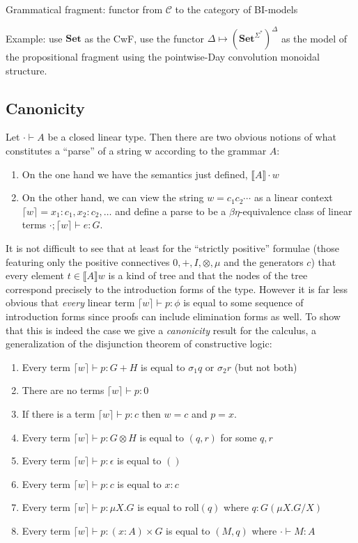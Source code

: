 \documentclass[sigconf,anonymous,review,screen]{acmart}
\newcommand{\Set}{\mathbf{Set}}
\begin{document}
Grammatical fragment: functor from $\mathcal C$ to the category of BI-models

Example: use $\Set$ as the CwF, use the functor $\Delta \mapsto
(\Set^{\Sigma^*})^\Delta$ as the model of the propositional fragment
using the pointwise-Day convolution monoidal structure.

\subsection{Canonicity}

Let $\cdot \vdash A$ be a closed linear type. Then there are
two obvious notions of what constitutes a ``parse'' of a string w
according to the grammar $A$:
\begin{enumerate}
\item On the one hand we have the semantics just defined, $\llbracket A \rrbracket \cdot w$
\item On the other hand, we can view the string $w = c_1c_2\cdots$ as
  a linear context $\lceil w \rceil = x_1:c_1,x_2:c_2,\ldots$ and
  define a parse to be a $\beta\eta$-equivalence class of linear terms $\cdot;
  \lceil w \rceil \vdash e : G$.
\end{enumerate}
It is not difficult to see that at least for the ``strictly positive''
formulae (those featuring only the positive connectives
$0,+,I,\otimes,\mu$ and the generators $c$) that every element $t \in
\llbracket A \rrbracket w$ is a kind of tree and that the nodes of the
tree correspond precisely to the introduction forms of the
type. However it is far less obvious that \emph{every} linear term
$\lceil w \rceil \vdash p : \phi$ is equal to some sequence of
introduction forms since proofs can include elimination forms as
well. To show that this is indeed the case we give a \emph{canonicity}
result for the calculus, a generalization of the disjunction theorem
of constructive logic:
\begin{enumerate}
\item Every term $\lceil w \rceil \vdash p : G + H$ is equal to $\sigma_1q$ or $\sigma_2 r$ (but not both)
\item There are no terms $\lceil w \rceil \vdash p : 0$
\item If there is a term $\lceil w \rceil \vdash p : c$ then $w = c$ and $p = x$.
\item Every term $\lceil w \rceil \vdash p : G \otimes H$ is equal to $(q,r)$ for some $q,r$
\item Every term $\lceil w \rceil \vdash p : \epsilon$ is equal to $()$
\item Every term $\lceil w \rceil \vdash p : c$ is equal to $x:c$
\item Every term $\lceil w \rceil \vdash p : \mu X. G$ is equal to $\textrm{roll}(q)$ where $q : G(\mu X.G/X)$
\item Every term $\lceil w \rceil \vdash p : (x:A) \times G$ is equal
  to $(M,q)$ where $\cdot \vdash M : A$
\end{enumerate}
\end{document}
